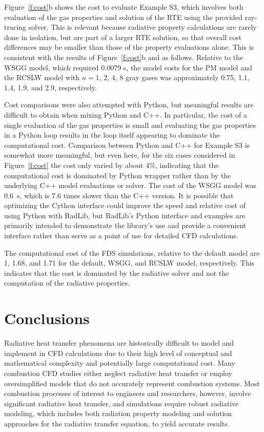 \documentclass[preprint,12pt]{elsarticle}
\begin{document}
Figure~\ref{f:cost}b shows the cost to evaluate Example S3, which involves both evaluation of the gas properties and solution of the RTE using the provided ray-tracing solver. This is relevant because radiative property calculations are rarely done in isolation, but are part of a larger RTE solution, so that overall cost differences may be smaller than those of the property evaluations alone. This is consistent with the results of Figure~\ref{f:cost}b and as follows. Relative to the WSGG model, which required 0.0079 s, the model costs for the PM model and the RCSLW model with $n=1$, 2, 4, 8 gray gases was approximately 0.75, 1.1, 1.4, 1.9, and 2.9, respectively.

Cost comparisons were also attempted with Python, but meaningful results are difficult to obtain when mixing Python and C++. In particular, the cost of a single evaluation of the gas properties is small and evaluating the gas properties in a Python loop results in the loop itself appearing to dominate the computational cost. Comparison between Python and C++ for Example S3 is somewhat more meaningful, but even here, for the six cases considered in Figure~\ref{f:cost} the cost only varied by about 4\%, indicating that the computational cost is dominated by Python wrapper rather than by the underlying C++ model evaluations or solver. The cost of the WSGG model was 0.6~s, which is 7.6 times slower than the C++ version. It is possible that optimizing the Cython interface could improve the speed and relative cost of using Python with RadLib, but RadLib's Python interface and examples are primarily intended to demonstrate the library's use and provide a convenient interface rather than serve as a point of use for detailed CFD calculations.

The computational cost of the FDS simulations, relative to the default model are 1, 1.68, and 1.71 for the default, WSGG, and RCSLW model, respectively. This indicates that the cost is dominated by the radiative solver and not the computation of the radiative properties.



\section{Conclusions} \label{s:conclusions}

Radiative heat transfer phenomena are historically difficult to model and implement in CFD calculations due to their high level of conceptual and mathematical complexity and potentially large computational cost. Many combustion CFD studies either neglect radiative heat transfer or employ oversimplified models that do not accurately represent combustion systems. Most combustion processes of interest to engineers and researchers, however, involve significant radiative heat transfer, and simulations require robust radiative modeling, which includes both radiation property modeling and solution approaches for the radiative transfer equation, to yield accurate results.
\end{document}
